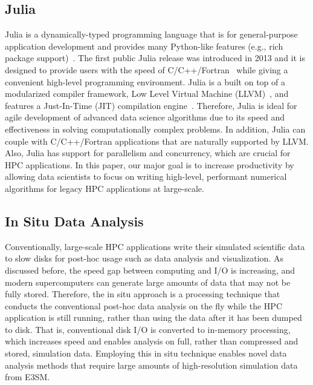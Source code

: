 \documentclass{juliacon}
\begin{document}
\subsection{Julia}

Julia is a dynamically-typed programming language that is for general-purpose application development and provides many Python-like features (e.g., rich package support)~\cite{bezanson2012julia}. The first public Julia release was introduced in 2013 and it is designed to provide users with the speed of C/C++/Fortran~\cite{bezanson2017julia} while giving a convenient high-level programming environment. Julia is a built on top of a modularized compiler framework, Low Level Virtual Machine (LLVM)~\cite{lattner2004llvm}, and features a Just-In-Time (JIT) compilation engine~\cite{aycock2003brief}. Therefore, Julia is ideal for agile development of advanced data science algorithms due to its speed and effectiveness in solving computationally complex problems. In addition, Julia can couple with C/C++/Fortran applications that are naturally supported by LLVM. Also, Julia has support for parallelism and concurrency, which are crucial for HPC applications. In this paper, our major goal is to increase productivity by allowing data scientists to focus on writing high-level, performant numerical algorithms for legacy HPC applications at large-scale.






\subsection{In Situ Data Analysis}


Conventionally, large-scale HPC applications write their simulated scientific data to slow disks for post-hoc usage such as data analysis and visualization. As discussed before, the speed gap between computing and I/O is increasing, and modern supercomputers can generate large amounts of data that may not be fully stored. Therefore, the in situ approach is a processing technique that conducts the conventional post-hoc data analysis on the fly while the HPC application is still running, rather than using the data after it has been dumped to disk. That is, conventional disk I/O is converted to in-memory processing, which increases speed and enables analysis on full, rather than compressed and stored, simulation data. Employing this in situ technique enables novel data analysis methods that require large amounts of high-resolution simulation data from E3SM.
\end{document}
